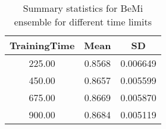 \begin{center}
\begin{table}[H]
\centering
\begin{tabular}{|c|c|c|}
  \hline
TrainingTime & Mean & SD \\ 
  \hline
225.00 & 0.8568 & 0.006649 \\ 
   \hline
450.00 & 0.8657 & 0.005599 \\ 
   \hline
675.00 & 0.8669 & 0.005870 \\ 
   \hline
900.00 & 0.8684 & 0.005119 \\ 
   \hline
\end{tabular}
\caption{Summary statistics for BeMi ensemble for different time limits} 
\label{BeMi_time_effect}
\end{table}

\end{center}
